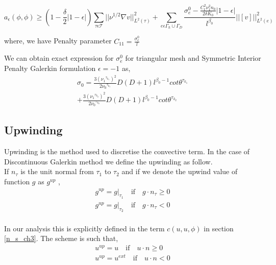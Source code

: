 \documentclass[a4paper,12pt]{book}
\begin{document}
\begin{equation}
a_\epsilon (\phi , \phi) \geq \left( 1-\frac{\delta}{2} |1-\epsilon| \right) \sum_{\tau \epsilon \mathcal{T}} ||\nu^{1/2} \nabla v ||^2_{L^2(\tau)} + \sum_{e \epsilon \Gamma_h \cup \Gamma_D} \frac{\sigma_e^0 - \frac{C_t^2 \nu_1^2 n_0}{2 \delta K_0}|1-\epsilon|}{l^{\beta_0}} ||[v]||^2_{L^2(e)}
\end{equation}

where, we have Penalty parameter $C_{11} = \frac{\sigma^0_e}{l}$

We can obtain exact expression for $\sigma^0_e$ for triangular mesh and Symmetric Interior Penalty Galerkin formulation $\epsilon = -1$ as,\\
\begin{equation}
\begin{split}
\sigma_0 = \frac{3 ( {\nu_1}^{\tau_{k_1}})^2}{2 {\nu_0}^{\tau_{k_1}}} D (D+1) l^{\beta_0 - 1} cot {\theta^{\tau_{k_1}}}  \\ + \frac{3 ( {\nu_1}^{\tau_{k_2}})^2}{2 {\nu_0}^{\tau_{k_2}}} D (D+1) l^{\beta_0 - 1} cot {\theta^{\tau_{k_2}}}
\end{split}
\end{equation} 

\subsection{Upwinding} \label{upwinding}

Upwinding is the method used to discretise the convective term. In the case of Discontinuous Galerkin method we define the upwinding as follow.\\

If $n_\tau$ is the unit normal from $\tau_1$ to $\tau_2$ and if we denote the upwind value of function $g$ as $g^{up}$ \cite{riviere},
\begin{equation}
\begin{split}
g^{up} = g|_{\tau_1} \quad \textrm{if} \quad g \cdot n_\tau \geq 0 \\
g^{up} = g|_{\tau_2} \quad \textrm{if} \quad g \cdot n_\tau < 0
\end{split}
\end{equation}
\\
In our analysis this is explicitly defined in the term $c(u,u,\phi)$ in section \ref{n_s_ch3}. The scheme is such that,
\begin{equation}
\begin{split}
u^{up} = u \quad \textrm{if} \quad u \cdot n \geq 0 \\
u^{up} = u^{ext} \quad \textrm{if} \quad u \cdot n < 0
\end{split}
\end{equation}
\end{document}
